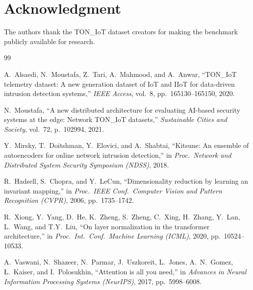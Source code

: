 \documentclass[journal,10pt,twoside]{IEEEtran}
\begin{document}
\section*{Acknowledgment}

The authors thank the TON\_IoT dataset creators for making the benchmark
publicly available for research.




\begin{thebibliography}{99}

A.\ Alsaedi, N.\ Moustafa, Z.\ Tari, A.\ Mahmood, and A.\ Anwar,
``TON\_IoT telemetry dataset: A new generation dataset of IoT and IIoT for
data-driven intrusion detection systems,''
\emph{IEEE Access}, vol.\ 8, pp.\ 165130--165150, 2020.

N.\ Moustafa,
``A new distributed architecture for evaluating AI-based security systems at
the edge: Network TON\_IoT datasets,''
\emph{Sustainable Cities and Society}, vol.\ 72, p.\ 102994, 2021.

Y.\ Mirsky, T.\ Doitshman, Y.\ Elovici, and A.\ Shabtai,
``Kitsune: An ensemble of autoencoders for online network intrusion
detection,''
in \emph{Proc.\ Network and Distributed System Security Symposium (NDSS)},
2018.

R.\ Hadsell, S.\ Chopra, and Y.\ LeCun,
``Dimensionality reduction by learning an invariant mapping,''
in \emph{Proc.\ IEEE Conf.\ Computer Vision and Pattern Recognition (CVPR)},
2006, pp.\ 1735--1742.

R.\ Xiong, Y.\ Yang, D.\ He, K.\ Zheng, S.\ Zheng, C.\ Xing, H.\ Zhang,
Y.\ Lan, L.\ Wang, and T.\-Y.\ Liu,
``On layer normalization in the transformer architecture,''
in \emph{Proc.\ Int.\ Conf.\ Machine Learning (ICML)}, 2020,
pp.\ 10524--10533.

A.\ Vaswani, N.\ Shazeer, N.\ Parmar, J.\ Uszkoreit, L.\ Jones, A.\ N.\ Gomez,
\L.\ Kaiser, and I.\ Polosukhin,
``Attention is all you need,''
in \emph{Advances in Neural Information Processing Systems (NeurIPS)}, 2017,
pp.\ 5998--6008.


\end{thebibliography}
\end{document}
